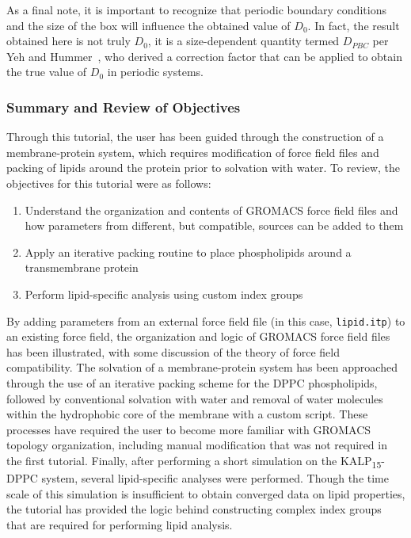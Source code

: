 \documentclass[9pt,tutorial]{livecoms}
\begin{document}
As a final note, it is important to recognize that periodic boundary conditions and the size of the box will influence the obtained value of $D_0$. In fact, the result obtained here is not truly $D_0$, it is a size-dependent quantity termed $D_{PBC}$ per Yeh and Hummer~\cite{Yeh2004}, who derived a correction factor that can be applied to obtain the true value of $D_0$ in periodic systems.

\subsubsection{Summary and Review of Objectives} \label{kalp_summary}

Through this tutorial, the user has been guided through the construction of a membrane-protein system, which requires modification of force field files and packing of lipids around the protein prior to solvation with water. To review, the objectives for this tutorial were as follows:

\begin{enumerate}
	\item Understand the organization and contents of GROMACS force field files and how parameters from different, but compatible, sources can be added to them
	\item Apply an iterative packing routine to place phospholipids around a transmembrane protein
	\item Perform lipid-specific analysis using custom index groups
\end{enumerate}

By adding parameters from an external force field file (in this case, \texttt{lipid.itp}) to an existing force field, the organization and logic of GROMACS force field files has been illustrated, with some discussion of the theory of force field compatibility. The solvation of a membrane-protein system has been approached through the use of an iterative packing scheme for the DPPC phospholipids, followed by conventional solvation with water and removal of water molecules within the hydrophobic core of the membrane with a custom script. These processes have required the user to become more familiar with GROMACS topology organization, including manual modification that was not required in the first tutorial. Finally, after performing a short simulation on the KALP\textsubscript{15}-DPPC system, several lipid-specific analyses were performed. Though the time scale of this simulation is insufficient to obtain converged data on lipid properties, the tutorial has provided the logic behind constructing complex index groups that are required for performing lipid analysis.
\end{document}
